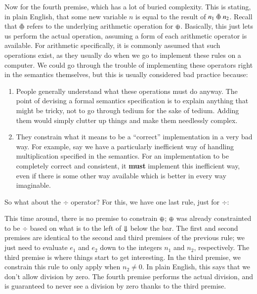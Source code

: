 \documentclass[nocopyrightspace]{sigplanconf}
\begin{document}
Now for the fourth premise, which has a lot of buried complexity.
This is stating, in plain English, that some new variable $n$ is equal to the result of $n_1 \;\bar{\oplus}\; n_2$.
Recall that $\bar{\oplus}$ refers to the underlying arithmetic operation for $\oplus$.
Basically, this just lets us perform the actual operation, assuming a form of each arithmetic operator is available.
For arithmetic specifically, it is commonly assumed that such operations exist, as they usually do when we go to implement these rules on a computer.
We could go through the trouble of implementing these operators right in the semantics themselves, but this is usually considered bad practice because:
\begin{enumerate}
  \item People generally understand what these operations must do anyway.
    The point of devising a formal semantics specification is to explain anything that might be tricky, not to go through tedium for the sake of tedium.
    Adding them would simply clutter up things and make them needlessly complex.
  \item They constrain what it means to be a ``correct'' implementation in a very bad way.
    For example, say we have a particularly inefficient way of handling multiplication specified in the semantics.
    For an implementation to be completely correct and consistent, it \textbf{must} implement this inefficient way, even if there is some other way available which is better in every way imaginable.
\end{enumerate}

So what about the $\div$ operator?
For this, we have one last rule, just for $\div$:


This time around, there is no premise to constrain $\oplus$; $\oplus$ was already constrainted to be $\div$ based on what is to the left of $\Downarrow$ below the bar.
The first and second premises are identical to the second and third premises of the previous rule; we just need to evaluate $e_1$ and $e_2$ down to the integers $n_1$ and $n_2$, respectively.
The third premise is where things start to get interesting.
In the third premise, we constrain this rule to only apply when $n_2 \neq 0$.
In plain English, this says that we don't allow division by zero.
The fourth premise performs the actual division, and is guaranteed to never see a division by zero thanks to the third premise.
\end{document}
